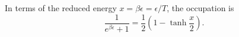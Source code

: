 \documentclass{article}
\begin{document}
In terms of the reduced energy $x = \beta\epsilon = \epsilon/T$, the occupation is
\begin{equation}
\frac{1}{e^{\beta\epsilon}+1} = \frac{1}{2}\left(1-\tanh\frac{x}{2}\right) .
\label{eq:occ}
\end{equation}
\end{document}
